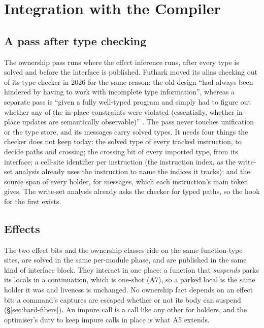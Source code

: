 \chapter{Integration with the Compiler}
\label{sec:compiler}

\section{A pass after type checking}
\label{sec:compiler-pass}

The ownership pass runs where the effect inference runs, after every type is solved and before the
interface is published. Futhark moved its alias checking out of its type checker in 2026 for the same
reason: the old design ``had always been hindered by having to work with incomplete type
information'', whereas a separate pass is ``given a fully well-typed program and simply had to figure
out whether any of the in-place constraints were violated (essentially, whether in-place updates are
semantically observable)'' \citep{henriksen2026rewrite}. The pass never touches unification or the
type store, and its messages carry solved types. It needs four things the checker does not keep
today: the solved type of every tracked instruction, to decide paths and crossing; the crossing bit of
every imported type, from its interface; a cell-site
identifier per instruction (the instruction index, as the write-set analysis already uses the
instruction to name the indices it tracks); and the source span of every holder, for messages, which
each instruction's main token gives. The write-set analysis already asks the checker for typed paths,
so the hook for the first exists.

\section{Effects}
\label{sec:compiler-effects}

The two effect bits and the ownership classes ride on the same function-type sites, are solved in the
same per-module phase, and are published in the same kind of interface block. They interact in one
place: a function that \emph{suspends} parks its locals in a continuation, which is one-shot (A7), so a
parked local is the same holder it was and liveness is unchanged. No ownership fact depends on an effect
bit: a command's captures are escaped whether or not its body can suspend (\S\ref{sec:hard-fibers}). An
impure call is a call like any other for holders, and the optimiser's duty to keep impure calls in place
is what A5 extends.

